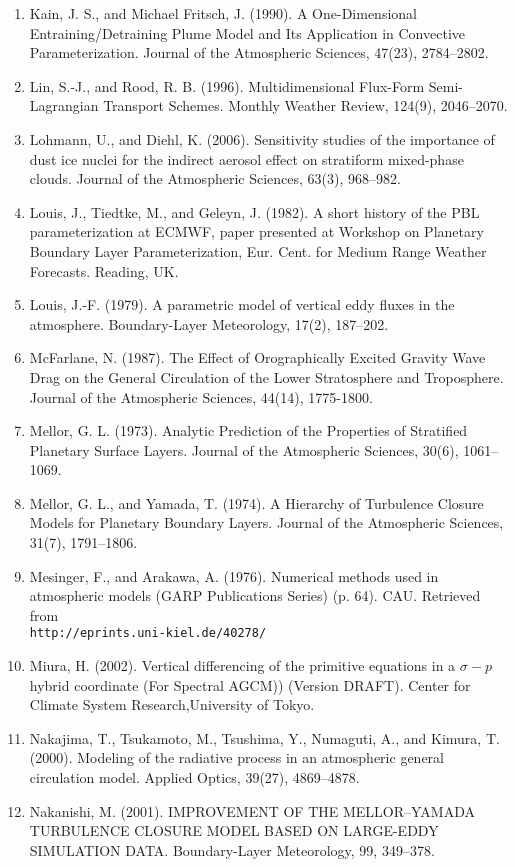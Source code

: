 \begin{enumerate}
\item Kain, J. S., and Michael Fritsch, J. (1990). A One-Dimensional Entraining/Detraining Plume Model and Its Application in Convective Parameterization. Journal of the Atmospheric Sciences, 47(23), 2784–2802.
\item Lin, S.-J., and Rood, R. B. (1996). Multidimensional Flux-Form Semi-Lagrangian Transport Schemes. Monthly Weather Review, 124(9), 2046–2070.
\item Lohmann, U., and Diehl, K. (2006). Sensitivity studies of the importance of dust ice nuclei for the indirect aerosol effect on stratiform mixed-phase clouds. Journal of the Atmospheric Sciences, 63(3), 968–982.
\item Louis, J., Tiedtke, M., and Geleyn, J. (1982). A short history of the PBL parameterization at ECMWF, paper presented at Workshop on Planetary Boundary Layer Parameterization, Eur. Cent. for Medium Range Weather Forecasts. Reading, UK.
\item Louis, J.-F. (1979). A parametric model of vertical eddy fluxes in the atmosphere. Boundary-Layer Meteorology, 17(2), 187–202.
\item McFarlane, N. (1987). The Effect of Orographically Excited Gravity Wave Drag on the General Circulation of the Lower Stratosphere and Troposphere. Journal of the Atmospheric Sciences, 44(14), 1775-1800.
\item Mellor, G. L. (1973). Analytic Prediction of the Properties of Stratified Planetary Surface Layers. Journal of the Atmospheric Sciences, 30(6), 1061–1069.
\item Mellor, G. L., and Yamada, T. (1974). A Hierarchy of Turbulence Closure Models for Planetary Boundary Layers. Journal of the Atmospheric Sciences, 31(7), 1791–1806.
\item Mesinger, F., and Arakawa, A. (1976). Numerical methods used in atmospheric models (GARP Publications Series) (p. 64). CAU. Retrieved from \\
\texttt{http://eprints.uni-kiel.de/40278/}
\item Miura, H. (2002). Vertical differencing of the primitive equations in a $\sigma - p$ hybrid coordinate (For Spectral AGCM)) (Version DRAFT). Center for Climate System Research,University of Tokyo.
\item Nakajima, T., Tsukamoto, M., Tsushima, Y., Numaguti, A., and Kimura, T. (2000). Modeling of the radiative process in an atmospheric general circulation model. Applied Optics, 39(27), 4869–4878.
\item Nakanishi, M. (2001). IMPROVEMENT OF THE MELLOR–YAMADA TURBULENCE CLOSURE MODEL BASED ON LARGE-EDDY SIMULATION DATA. Boundary-Layer Meteorology, 99, 349–378.

\end{enumerate}

